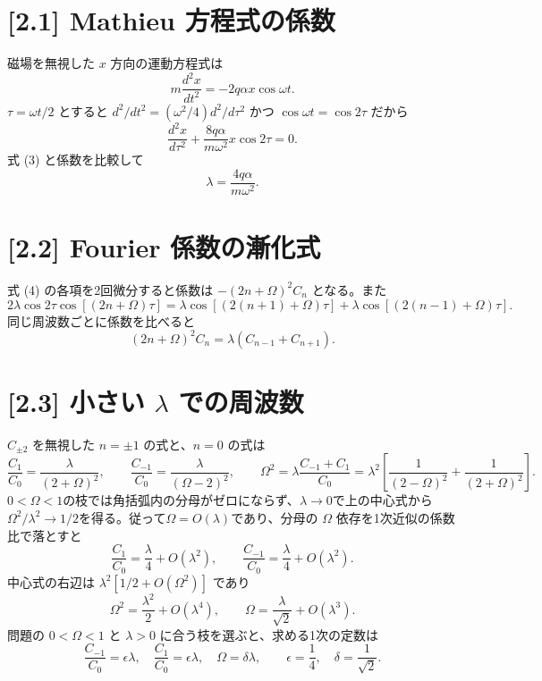 \documentclass[11pt,a4paper]{article}
\begin{document}
\section*{[2.1] Mathieu 方程式の係数}
磁場を無視した $x$ 方向の運動方程式は
\[
m\frac{d^2x}{dt^2}=-2q\alpha x\cos\omega t.
\]
$\tau=\omega t/2$ とすると $d^2/dt^2=(\omega^2/4)d^2/d\tau^2$ かつ
$\cos\omega t=\cos2\tau$ だから
\[
\frac{d^2x}{d\tau^2}+\frac{8q\alpha}{m\omega^2}x\cos2\tau=0.
\]
式 (3) と係数を比較して
\[
\boxed{\lambda=\frac{4q\alpha}{m\omega^2}}.
\]

\section*{[2.2] Fourier 係数の漸化式}
式 (4) の各項を2回微分すると係数は $-(2n+\Omega)^2C_n$ となる。また
\[
2\lambda\cos2\tau\cos[(2n+\Omega)\tau]
=\lambda\cos[(2(n+1)+\Omega)\tau]
+\lambda\cos[(2(n-1)+\Omega)\tau].
\]
同じ周波数ごとに係数を比べると
\[
\boxed{(2n+\Omega)^2C_n=\lambda(C_{n-1}+C_{n+1})}.
\]

\section*{[2.3] 小さい $\lambda$ での周波数}
$C_{\pm2}$ を無視した $n=\pm1$ の式と、$n=0$ の式は
\[
\frac{C_1}{C_0}=\frac{\lambda}{(2+\Omega)^2},\qquad
\frac{C_{-1}}{C_0}=\frac{\lambda}{(\Omega-2)^2},\qquad
\Omega^2=\lambda\frac{C_{-1}+C_1}{C_0}
=\lambda^2\left[\frac1{(2-\Omega)^2}+\frac1{(2+\Omega)^2}\right].
\]
$0<\Omega<1$の枝では角括弧内の分母がゼロにならず、$\lambda\to0$で上の中心式から$\Omega^2/\lambda^2\to1/2$を得る。従って$\Omega=O(\lambda)$であり、分母の $\Omega$ 依存を1次近似の係数比で落とすと
\[
\frac{C_1}{C_0}=\frac{\lambda}{4}+O(\lambda^2),\qquad
\frac{C_{-1}}{C_0}=\frac{\lambda}{4}+O(\lambda^2).
\]
中心式の右辺は $\lambda^2[1/2+O(\Omega^2)]$ であり
\[
\Omega^2=\frac{\lambda^2}{2}+O(\lambda^4),\qquad
\Omega=\frac{\lambda}{\sqrt2}+O(\lambda^3).
\]
問題の $0<\Omega<1$ と $\lambda>0$ に合う枝を選ぶと、求める1次の定数は
\[
\boxed{\frac{C_{-1}}{C_0}=\epsilon\lambda,\quad
\frac{C_1}{C_0}=\epsilon\lambda,\quad \Omega=\delta\lambda,
\qquad \epsilon=\frac14,\quad\delta=\frac1{\sqrt2}}.
\]
\end{document}
